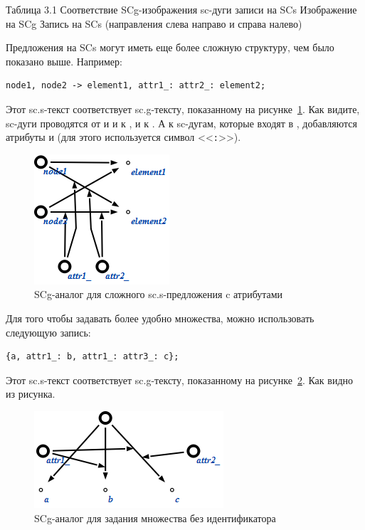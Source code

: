 Таблица 3.1 Соответствие SCg-изображения sc-дуги записи на SCs
Изображение на SCg  Запись на SCs (направления слева направо и справа налево)


Предложения на SCs могут иметь еще более сложную структуру, чем было
показано выше. Например:
\begin{verbatim}
node1, node2 -> element1, attr1_: attr2_: element2;
\end{verbatim}

Этот sc.s-текст соответствует sc.g-тексту, показанному на
рисунке~\ref{fig:SCs_sentence_with_attrs}. Как видите, sc-дуги
проводятся от  и  и к , и к
. А к sc-дугам, которые входят в ,
добавляются атрибуты  и  (для этого
используется символ <<\texttt{:}>>).

\begin{figure}[h!]
  \centering
  \includegraphics{images/5/scs/sentence_with_attrs}
  \caption{SCg-аналог для сложного sc.s-предложения c атрибутами}
  \label{fig:SCs_sentence_with_attrs}
\end{figure}

Для того чтобы задавать более удобно множества, можно использовать
следующую запись:
\begin{verbatim}
{a, attr1_: b, attr1_: attr3_: c};
\end{verbatim}

Этот sc.s-текст соответствует sc.g-тексту, показанному на
рисунке~\ref{fig:SCs_set}. Как видно из рисунка.

\begin{figure}[h!]
  \centering
  \includegraphics{images/5/scs/set}
  \caption{SCg-аналог для задания множества без идентификатора}
  \label{fig:SCs_set}
\end{figure}



